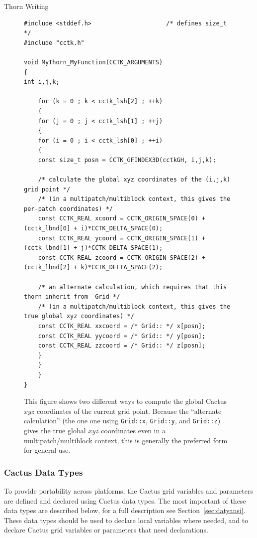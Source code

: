 \begin{cactuspart}{Thorn Writing}
\begin{figure}[bp]
\begin{verbatim}
#include <stddef.h>                     /* defines size_t */
#include "cctk.h"

void MyThorn_MyFunction(CCTK_ARGUMENTS)
{
int i,j,k;

    for (k = 0 ; k < cctk_lsh[2] ; ++k)
    {
    for (j = 0 ; j < cctk_lsh[1] ; ++j)
    {
    for (i = 0 ; i < cctk_lsh[0] ; ++i)
    {
    const size_t posn = CCTK_GFINDEX3D(cctkGH, i,j,k);

    /* calculate the global xyz coordinates of the (i,j,k) grid point */
    /* (in a multipatch/multiblock context, this gives the per-patch coordinates) */
    const CCTK_REAL xcoord = CCTK_ORIGIN_SPACE(0) + (cctk_lbnd[0] + i)*CCTK_DELTA_SPACE(0);
    const CCTK_REAL ycoord = CCTK_ORIGIN_SPACE(1) + (cctk_lbnd[1] + j)*CCTK_DELTA_SPACE(1);
    const CCTK_REAL zcoord = CCTK_ORIGIN_SPACE(2) + (cctk_lbnd[2] + k)*CCTK_DELTA_SPACE(2);

    /* an alternate calculation, which requires that this thorn inherit from  Grid */
    /* (in a multipatch/multiblock context, this gives the true global xyz coordinates) */
    const CCTK_REAL xxcoord = /* Grid:: */ x[posn];
    const CCTK_REAL yycoord = /* Grid:: */ y[posn];
    const CCTK_REAL zzcoord = /* Grid:: */ z[posn];
    }
    }
    }
}
\end{verbatim}
\caption{%
	This figure shows two different ways to compute the global
	Cactus $xyz$ coordinates of the current grid point.  Because
	the ``alternate calculation'' (the one one using \texttt{Grid::x},
	\texttt{Grid::y}, and \texttt{Grid::z}) gives the true global
	$xyz$ coordinates even in a multipatch/multiblock context,
	this is generally the preferred form for general use.
	}
\label{fig-global-xyz-coords}
\end{figure}

\subsubsection{Cactus Data Types}

To provide portability across platforms, the Cactus grid variables and parameters are defined and
declared using Cactus data types. The most important of
these data types are described below, for a full description
see Section~\ref{sec:datyansi}. These data types should
be used to declare local variables where needed, and to
declare Cactus grid variables or parameters that need
declarations.


\end{cactuspart}
